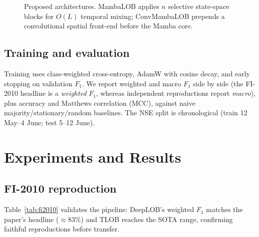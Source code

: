 \documentclass[fonts]{icst}
\begin{document}
\begin{figure}[t]
\centering
{}
\caption{Proposed architectures. MambaLOB applies $n$ selective state-space blocks for $O(L)$ temporal mixing;
ConvMambaLOB prepends a convolutional spatial front-end before the Mamba core.}
\label{fig:arch}
\end{figure}

\subsection{Training and evaluation}
Training uses class-weighted cross-entropy, AdamW with cosine decay, and early stopping on validation
$F_1$. We report weighted and macro $F_1$ side by side (the FI-2010 headline is a \emph{weighted} $F_1$,
whereas independent reproductions report \emph{macro}), plus accuracy and Matthews correlation (MCC), against
naive majority/stationary/random baselines. The NSE split is chronological (train 12 May--4 June; test
5--12 June).

\section{Experiments and Results}
\subsection{FI-2010 reproduction}
Table~\ref{tab:fi2010} validates the pipeline: DeepLOB's weighted $F_1$ matches the paper's headline
($\approx$83\%) and TLOB reaches the SOTA range, confirming faithful reproductions before transfer.
\end{document}

